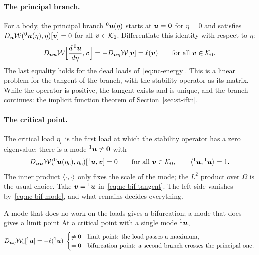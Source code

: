 \paragraph{The principal branch.}
%
For a body, the principal branch ${}^0\bm{u}(\eta)$ starts at $\bm{u} = \bm{0}$ for $\eta = 0$ and
satisfies $D_{\bm{u}}\mathcal{W}({}^0\bm{u}(\eta),\eta)[\bm{v}] = 0$ for all $\bm{v}\in\mathcal{K}_0$. Differentiate
this identity with respect to $\eta$:
\begin{equation}\label{eq:nc-bif-tangent}
  D_{\bm{u}\bm{u}}\mathcal{W}\Bigl[\frac{d\,{}^0\bm{u}}{d\eta},\bm{v}\Bigr] = -D_{\bm{u}\eta}\mathcal{W}[\bm{v}]
  = \ell(\bm{v})
  \qquad\text{for all } \bm{v} \in \mathcal{K}_0 .
\end{equation}
The last equality holds for the dead loads of~\eqref{eq:nc-energy}. This is a linear
problem for the tangent of the branch, with the stability operator as its matrix. While
the operator is positive, the tangent exists and is unique, and the branch continues: the
implicit function theorem of Section~\ref{sec:st-iftn}.

\paragraph{The critical point.}
%
The critical load $\eta_c$ is the first load at which the stability operator has a zero
eigenvalue: there is a mode ${}^1\bm{u} \neq \bm{0}$ with
\begin{equation}\label{eq:nc-bif-mode}
  D_{\bm{u}\bm{u}}\mathcal{W}({}^0\bm{u}(\eta_c),\eta_c)[{}^1\bm{u},\bm{v}] = 0
  \qquad\text{for all } \bm{v} \in \mathcal{K}_0 ,
  \qquad \langle {}^1\bm{u},{}^1\bm{u}\rangle = 1 .
\end{equation}
The inner product $\langle \cdot,\cdot\rangle$ only fixes the scale of the mode; the $L^2$ product
over $\Omega$ is the usual choice. Take $\bm{v} = {}^1\bm{u}$ in~\eqref{eq:nc-bif-tangent}. The left
side vanishes by~\eqref{eq:nc-bif-mode}, and what remains decides everything.

\begin{gbox}{A mode that does no work on the loads gives a bifurcation; a mode that does gives a limit point}\label{sec:nc-bif-test}
%
At a critical point with a single mode ${}^1\bm{u}$,
\begin{equation}\label{eq:nc-bif-test}
  D_{\bm{u}\eta}\mathcal{W}_c[{}^1\bm{u}] = -\ell({}^1\bm{u})
  \;\begin{cases} \neq 0 & \text{limit point: the load passes a maximum,}\\
                 = 0 & \text{bifurcation point: a second branch crosses the principal one.}
  \end{cases}
\end{equation}
\end{gbox}

